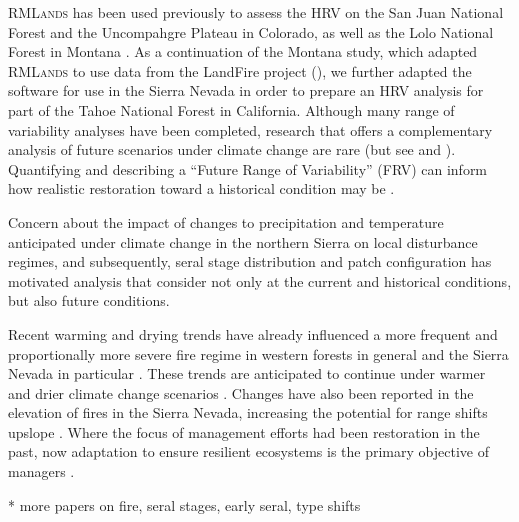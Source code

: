 \textsc{RMLands} has been used previously to assess the HRV on the San Juan National Forest \citep{Mcgarigal2012} and the Uncompahgre Plateau \citep{Romme2009} in Colorado, as well as the Lolo National Forest in Montana \citep{Cushman2011}. As a continuation of the Montana study, which adapted \textsc{RMLands} to use data from the LandFire project (), we further adapted the software for use in the Sierra Nevada in order to prepare an HRV analysis for part of the Tahoe National Forest in California. Although many range of variability analyses have been completed, research that offers a complementary analysis of future scenarios under climate change are rare (but see \cite{Keane2008} and \cite{Duveneck2014}). Quantifying and describing a ``Future Range of Variability'' (FRV) can inform how realistic restoration toward a historical condition may be \citep{Duncan2010}.



Concern about the impact of changes to precipitation and temperature anticipated under climate change in the northern Sierra on local disturbance regimes, and subsequently, seral stage distribution and patch configuration has motivated analysis that consider not only at the current and historical conditions, but also future conditions\citep{Fule2008,North2012}. 

Recent warming and drying trends have already influenced a more frequent and proportionally more severe fire regime in western forests in general and the Sierra Nevada in particular \citep{McKenzie2004,Westerling2011,Miller2012}. These trends are anticipated to continue under warmer and drier climate change scenarios \citep{Westerling2008}. Changes have also been reported in the elevation of fires in the Sierra Nevada, increasing the potential for range shifts upslope \citep{Schwartz2015}. Where the focus of management efforts had been restoration in the past, now adaptation to ensure resilient ecosystems is the primary objective of managers \citep{Stephens2010}. 

* more papers on fire, seral stages, early seral, type shifts


